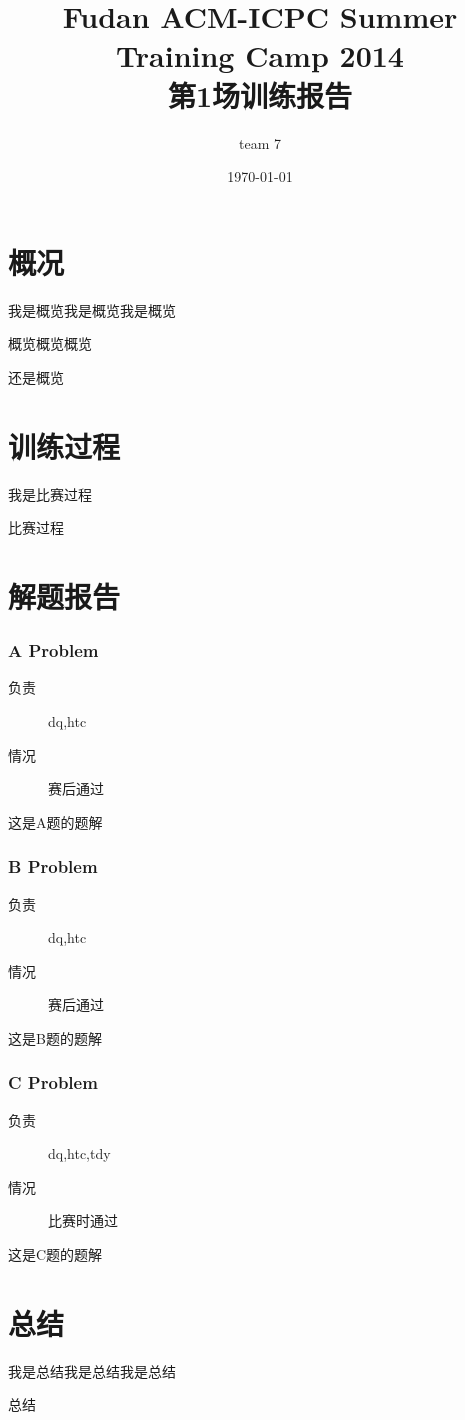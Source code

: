 \documentclass[a4paper, 11pt, nofonts, nocap, fancyhdr]{ctexart}
\title{Fudan ACM-ICPC Summer Training Camp 2014\\第1场训练报告}
\author{team 7}
\date{\today}
\newcommand{\problem}[1]{\subsubsection{#1}}
\begin{document}
\maketitle

\section{概况}

我是概览我是概览我是概览

概览概览概览

还是概览


\section{训练过程}

我是比赛过程

比赛过程


\section{解题报告}

\problem{A Problem}

\begin{description}
\item[负责] dq,htc
\item[情况] 赛后通过
\end{description}

这是A题的题解

\problem{B Problem}

\begin{description}
\item[负责] dq,htc
\item[情况] 赛后通过
\end{description}

这是B题的题解

\problem{C Problem}

\begin{description}
\item[负责] dq,htc,tdy
\item[情况] 比赛时通过
\end{description}

这是C题的题解



\section{总结}

我是总结我是总结我是总结

总结
\end{document}
